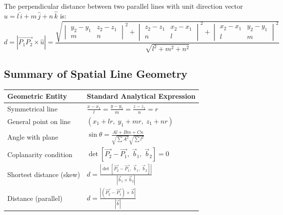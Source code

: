 \begin{theorembox}
The perpendicular distance between two parallel lines with unit direction vector $\hat{u} = l\,\hat{i} + m\,\hat{j} + n\,\hat{k}$ is:
\begin{equation}
    \boxed{d = |\vec{P_1 P_2} \times \hat{u}| = \frac{\sqrt{\begin{vmatrix} y_2-y_1 & z_2-z_1 \\ m & n \end{vmatrix}^2 + \begin{vmatrix} z_2-z_1 & x_2-x_1 \\ n & l \end{vmatrix}^2 + \begin{vmatrix} x_2-x_1 & y_2-y_1 \\ l & m \end{vmatrix}^2}}{\sqrt{l^2 + m^2 + n^2}}}
\end{equation}
\end{theorembox}

\subsection{Summary of Spatial Line Geometry}
\begin{center}
\begin{tabular}{|l|l|}
\hline
\textbf{Geometric Entity} & \textbf{Standard Analytical Expression} \\
\hline
Symmetrical line & $\frac{x-x_1}{l} = \frac{y-y_1}{m} = \frac{z-z_1}{n} = r$ \\
General point on line & $(x_1 + lr, \; y_1 + mr, \; z_1 + nr)$ \\
Angle with plane & $\sin\theta = \frac{Al+Bm+Cn}{\sqrt{\sum A^2}\sqrt{\sum l^2}}$ \\
Coplanarity condition & $\det[\vec{P_2}-\vec{P_1}, \; \vec{b}_1, \; \vec{b}_2] = 0$ \\
Shortest distance (skew) & $d = \frac{|\det[\vec{P_2}-\vec{P_1}, \; \vec{b}_1, \; \vec{b}_2]|}{|\vec{b}_1 \times \vec{b}_2|}$ \\
Distance (parallel) & $d = \frac{|(\vec{P_2}-\vec{P_1}) \times \vec{b}|}{|\vec{b}|}$ \\
\hline
\end{tabular}
\end{center}
